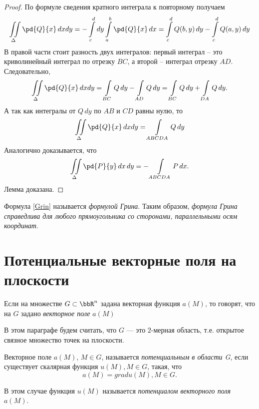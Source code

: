 \begin{proof}
По формуле сведения кратного интеграла к повторному получаем
$$
\iint\limits_{\Delta} \pd{Q}{x} \,dxdy = -\int_{c}^{d}\limits dy \int_a^b\limits \pd{Q}{x}\,dx = \int_c^d\limits Q(b,y)\,dy - \int_c^d\limits Q(a,y)\,dy
$$
В правой части стоит разность двух интегралов: первый интеграл -- это криволинейный интеграл по отрезку $BC$, а второй -- интеграл отрезку $AD$. Следовательно,
$$
\iint\limits_\Delta\pd{Q}{x}\,dxdy = \int_{BC}\limits Q\,dy - \int_{AD}\limits Q\,dy = \int_{BC}\limits Q\,dy + \int_{DA}\limits Q\,dy.
$$
А так как интегралы от $Q\,dy$ по $AB$ и $CD$ равны нулю, то
$$
\iint\limits_\Delta\pd{Q}{x}\,dxdy = \int\limits_{ABCDA} Q\,dy
$$
Аналогично доказывается, что
$$
\iint\limits_\Delta\pd{P}{y}\,dx\,dy = -\int\limits_{ABCDA} P\,dx.  
$$ 
\noindent
Лемма доказана.
\end{proof}
Формула \eqref{Grin} называется \textit{формулой Грина}. Таким образом, \textit{формула Грина справедлива для любого прямоугольника со сторонами, параллельными осям координат}.


\section{Потенциальные векторные поля на плоскости}

Если на множестве $G \subset \bbR^n$ задана векторная функция $a(M)$, то говорят, что на $G$ задано \textit{векторное поле} $a(M)$ 

В этом параграфе будем считать, что $G$ --- это $2$-мерная область, т.е. открытое связное множество точек на плоскости.

\begin{defn}
Векторное поле $a(M)$, $M\in G$, называется \textit{потенциальным в области G}, если существует скалярная функция $u(M), M\in G$, такая, что 
$$
a(M) = grad u(M), M \in G.
$$

В этом случае функция $u(M)$ называется \textit{потенциалом векторного поля} $a(M)$.
\end{defn}